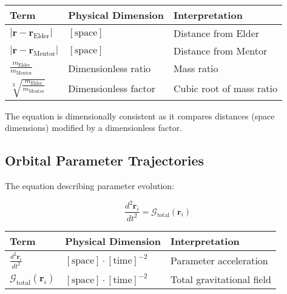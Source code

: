 \begin{center}
\label{tab:dimensional_analysis_elder_dominance}
\begin{tabular}{p{4cm} p{4cm} p{6cm}}
\textbf{Term} & \textbf{Physical Dimension} & \textbf{Interpretation} \\
\hline
$|\mathbf{r} - \mathbf{r}_{\text{Elder}}|$ & $[\text{space}]$ & Distance from Elder \\
$|\mathbf{r} - \mathbf{r}_{\text{Mentor}}|$ & $[\text{space}]$ & Distance from Mentor \\
$\frac{m_{\text{Elder}}}{m_{\text{Mentor}}}$ & Dimensionless ratio & Mass ratio \\
$\sqrt[3]{\frac{m_{\text{Elder}}}{m_{\text{Mentor}}}}$ & Dimensionless factor & Cubic root of mass ratio \\
\hline
\end{tabular}
\end{center}

The equation is dimensionally consistent as it compares distances (space dimensions) modified by a dimensionless factor.

\subsection{Orbital Parameter Trajectories}

The equation describing parameter evolution:

\begin{equation}
\frac{d^2\mathbf{r}_i}{dt^2} = \mathcal{G}_{\text{total}}(\mathbf{r}_i)
\end{equation}

\begin{center}
\label{tab:dimensional_analysis_parameter_trajectory}
\begin{tabular}{p{3cm} p{5cm} p{6cm}}
\textbf{Term} & \textbf{Physical Dimension} & \textbf{Interpretation} \\
\hline
$\frac{d^2\mathbf{r}_i}{dt^2}$ & $[\text{space}] \cdot [\text{time}]^{-2}$ & Parameter acceleration \\
$\mathcal{G}_{\text{total}}(\mathbf{r}_i)$ & $[\text{space}] \cdot [\text{time}]^{-2}$ & Total gravitational field \\
\hline
\end{tabular}
\end{center}

